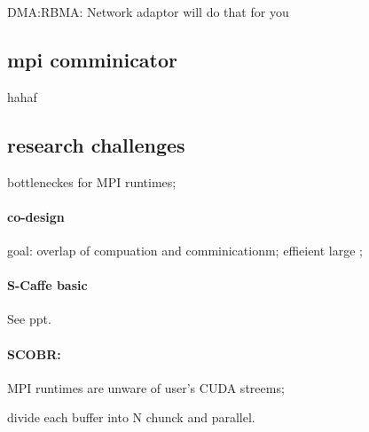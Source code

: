 \documentclass[12pt]{article}
\begin{document}
DMA:RBMA: Network adaptor will do that for you

\subsection{mpi comminicator} hahaf

\subsection{research challenges}
bottleneckes for MPI runtimes;

\paragraph{co-design}
goal: overlap of compuation and comminicationm;
effieient large ;

\paragraph{S-Caffe basic}

See ppt.

\paragraph{SCOBR:}
MPI runtimes are unware of user's CUDA streems;

divide each buffer into N chunck and parallel.
\end{document}
